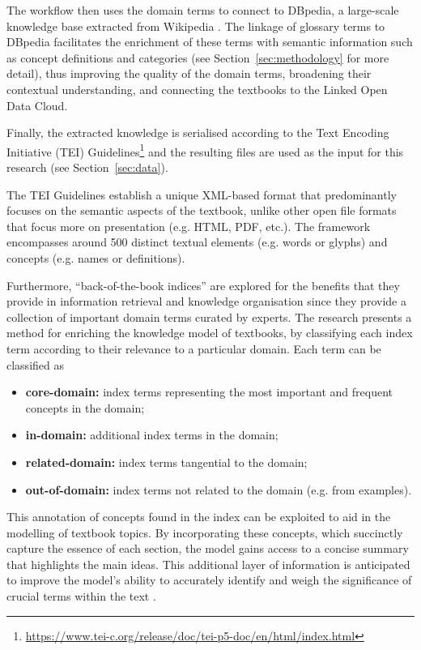 \documentclass[twocolumn]{article}
\begin{document}
The workflow then uses the domain terms to connect to DBpedia, a large-scale knowledge base extracted from Wikipedia \cite{lehmann2015}. The linkage of glossary terms to DBpedia facilitates the enrichment of these terms with semantic information such as concept definitions and categories (see Section~\ref{sec:methodology} for more detail), thus improving the quality of the domain terms, broadening their contextual understanding, and connecting the textbooks to the Linked Open Data Cloud.

Finally, the extracted knowledge is serialised according to the Text Encoding Initiative (TEI) Guidelines\footnote{\url{https://www.tei-c.org/release/doc/tei-p5-doc/en/html/index.html}} and the resulting files are used as the input for this research (see Section~\ref{sec:data}).

The TEI Guidelines establish a unique XML-based format that predominantly focuses on the semantic aspects of the textbook, unlike other open file formats that focus more on presentation (e.g. HTML, PDF, etc.). The framework encompasses around 500 distinct textual elements (e.g. words or glyphs) and concepts (e.g. names or definitions).

Furthermore, ``back-of-the-book indices'' are explored for the benefits that they provide in information retrieval and knowledge organisation since they provide a collection of important domain terms curated by experts. The research presents a method for enriching the knowledge model of textbooks, by classifying each index term according to their relevance to a particular domain. Each term can be classified as
\vspace{-0.6em}\begin{itemize}\itemsep-0.3em
    \item \textbf{core-domain:} index terms representing the most important and frequent concepts in the domain;
    \item \textbf{in-domain:} additional index terms in the domain;
    \item \textbf{related-domain:} index terms tangential to the domain;
    \item \textbf{out-of-domain:} index terms not related to the domain (e.g. from examples).
\end{itemize}\vspace{-0.6em}

This annotation of concepts found in the index can be exploited to aid in the modelling of textbook topics. By incorporating these concepts, which succinctly capture the essence of each section, the model gains access to a concise summary that highlights the main ideas. This additional layer of information is anticipated to improve the model's ability to accurately identify and weigh the significance of crucial terms within the text \cite{alpizarchacon2023a,alpizarchacon2023}.
\end{document}
